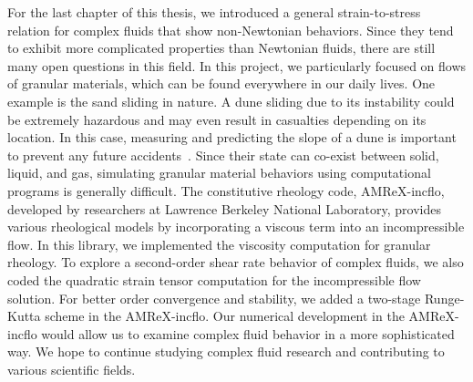 \par
For the last chapter of this thesis, we introduced a general strain-to-stress relation for complex fluids that show non-Newtonian behaviors. 
Since they tend to exhibit more complicated properties than Newtonian fluids,
there are still many open questions in this field.
In this project, we particularly focused on flows of granular materials, which can be found everywhere in our daily lives. 
One example is the sand sliding in nature. A dune sliding due to its instability could be extremely hazardous and may even result in casualties depending on its location. In this case, measuring and predicting the slope of a dune is important to prevent any future accidents~\cite{xie_summary_2021}.
Since their state can co-exist between solid, liquid, and gas, simulating granular material behaviors using computational programs is generally difficult. 
The constitutive rheology code, AMReX-incflo, developed by researchers at Lawrence Berkeley National Laboratory, provides various rheological models by incorporating a viscous term into an incompressible flow. 
In this library, we implemented the viscosity computation for granular rheology. 
To explore a second-order shear rate behavior of complex fluids, we also coded the quadratic strain tensor computation for the incompressible flow solution. 
For better order convergence and stability, we added a two-stage Runge-Kutta scheme in the AMReX-incflo. 
Our numerical development in the AMReX-incflo would allow us to examine complex fluid behavior in a more sophisticated way.
We hope to continue studying complex fluid research and contributing to various scientific fields. 
